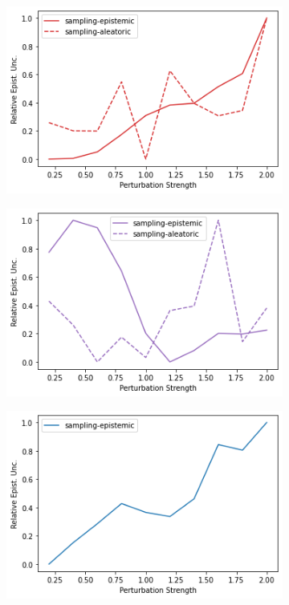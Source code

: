 \begin{figure}
    \begin{subfigure}{.24\textwidth}
        \includegraphics[width=\textwidth]{sections/011_icml2022/resources/action_shift-DropOut-LunarLanderShift-v0-mean_epistemic_uncertainty_.png}
    \end{subfigure}
    \begin{subfigure}{.24\textwidth}
        \includegraphics[width=\textwidth]{sections/011_icml2022/resources/action_shift-Ensemble-LunarLanderShift-v0-mean_epistemic_uncertainty_.png}
    \end{subfigure}
    \begin{subfigure}{.24\textwidth}
        \includegraphics[width=\textwidth]{sections/011_icml2022/resources/action_shift-DKL-LunarLanderShift-v0-mean_epistemic_uncertainty_.png}

\end{subfigure}
\end{figure}
